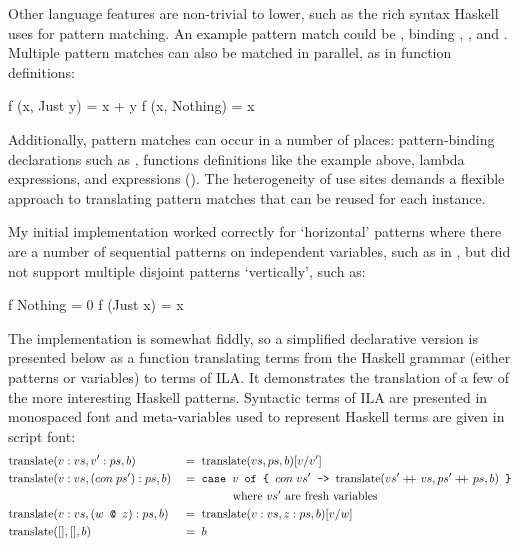 \documentclass[dissertation.tex]{subfiles}
\begin{document}
{{{            Other language features are non-trivial to lower, such as the rich syntax Haskell uses for pattern matching. An example pattern match could be , binding , , and . Multiple pattern matches can also be matched in parallel, as in function definitions:

            \begin{haskellfigure}
            f (x, Just y) = x + y
            f (x, Nothing) = x
            \end{haskellfigure}

            Additionally, pattern matches can occur in a number of places: pattern-binding declarations such as , functions definitions like the example above, lambda expressions, and  expressions (). The heterogeneity of use sites demands a flexible approach to translating pattern matches that can be reused for each instance.

            My initial implementation worked correctly for `horizontal' patterns where there are a number of sequential patterns on independent variables, such as in , but did not support multiple disjoint patterns `vertically', such as:

            \begin{haskellfigure}
            f Nothing = 0
            f (Just x) = x
            \end{haskellfigure}

            The implementation is somewhat fiddly, so a simplified declarative version is presented below as a function translating terms from the Haskell grammar (either patterns or variables) to terms of ILA. It demonstrates the translation of a few of the more interesting Haskell patterns. Syntactic terms of ILA are presented in monospaced font and meta-variables used to represent Haskell terms are given in script font:
            \begin{alignat*}{2}
            \text{translate} & (v:vs, v':ps, b) && =\; \text{translate} (vs, ps, b) [v/v'] \\
            \text{translate} & (v:vs, (con\;ps'):ps, b) && =\; \texttt{case } v \texttt{ of \{ }con\;vs'\texttt{ -> }
            \text{translate} (vs' +\kern-1.3ex+\kern0.8ex vs, ps' +\kern-1.3ex+\kern0.8ex ps, b) \texttt{ \}} \\
            & && \hspace{1.5cm}\text{where } vs' \text{ are fresh variables} \\
            \text{translate} & (v:vs, (w \texttt{ @ } z):ps, b) && =\; \text{translate} (v:vs, z:ps, b) [v/w] \\
            \text{translate} & ([], [], b) && =\; b
            \end{alignat*}

}}}
\end{document}
